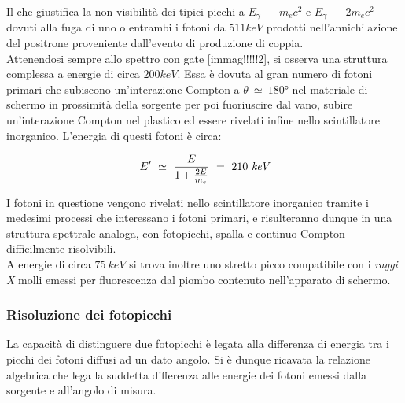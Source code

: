 \documentclass[5pt]{article}
\begin{document}
Il che giustifica la non visibilità dei tipici picchi a $E_\gamma \ - \ m_e c^2$ e $E_\gamma \ - \ 2m_e c^2$ dovuti alla fuga di uno o entrambi i fotoni da $511 keV$ prodotti nell'annichilazione del positrone proveniente dall'evento di produzione di coppia.\\
Attenendosi sempre allo spettro con gate [immag!!!!!2], si osserva una struttura complessa a energie di circa $200 keV$. Essa è dovuta al gran numero di fotoni primari che subiscono un'interazione Compton a $\theta \ \simeq \ 180°$ nel materiale di schermo in prossimità della sorgente per poi fuoriuscire dal vano, subire un'interazione Compton nel plastico ed essere rivelati infine nello scintillatore inorganico. L'energia di questi fotoni è circa:

\begin{equation}
E'\ \simeq \ \frac{E}{1+\frac{2E}{m_e}} \ = \ 210\ \emph{keV}
\end{equation}

I fotoni in questione vengono rivelati nello scintillatore inorganico tramite i medesimi processi che interessano i fotoni primari, e risulteranno dunque in una struttura spettrale analoga, con fotopicchi, spalla e continuo Compton difficilmente risolvibili. \\

A energie di circa $75 \ keV$ si trova inoltre uno stretto picco compatibile con i \textit{raggi X} molli emessi per fluorescenza dal piombo contenuto nell'apparato di schermo. \cite{X_Ray}

\subsubsection{Risoluzione dei fotopicchi}
La capacità di distinguere due fotopicchi è legata alla differenza di energia tra i picchi dei fotoni diffusi ad un dato angolo. Si è dunque ricavata la relazione algebrica che lega la suddetta differenza alle energie dei fotoni emessi dalla sorgente e all'angolo di misura. 
\end{document}
